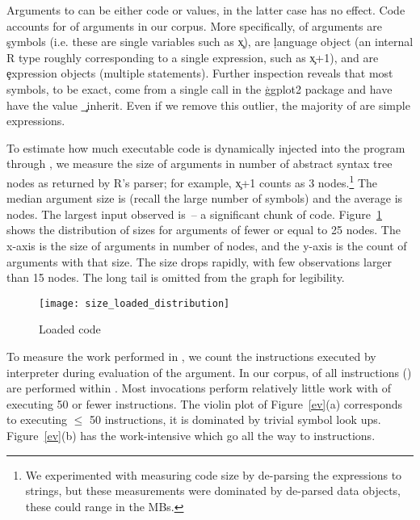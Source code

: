 \documentclass[USenglish,cleveref, autoref, thm-restate]{lipics-v2019}
\begin{document}
Arguments to \eval can be either code or values, in the latter case
\eval has no effect. Code accounts for \Codepercent of arguments in
our corpus. More specifically, \Symbolpercent of arguments are
\c{symbol}s (i.e. these are single variables such as \c{x}),
\Languagepercent are \c{language} object (an internal R type roughly
corresponding to a single expression, such as \c{x+1}), and
\Expressionpercent are \c{expression} objects (multiple statements).
Further inspection reveals that most symbols, \Ggplotsymbolpercent to
be exact, come from a single call in the \c{ggplot2} package and have
have the value \c{_inherit}. Even if we remove this outlier, the
majority of \evals are simple expressions.

To estimate how much executable code is dynamically injected into the
program through \eval, we measure the size of arguments in number of
abstract syntax tree nodes as returned by R's parser; for example,
\c{x+1} counts as 3 nodes.\footnote{We experimented with measuring
code size by de-parsing the expressions to strings, but these
measurements were dominated by de-parsed data objects, these could
range in the MBs.} The median argument size is \Medianszeval (recall
the large number of symbols) and the average is \Avgszeval nodes. The
largest \eval input observed is \Maxszeval\,-- a significant chunk of
code. Figure~\ref{fig:sizedistribution} shows the distribution of
sizes for arguments of fewer or equal to 25 nodes. The x-axis is the
size of arguments in number of nodes, and the y-axis is the count of
arguments with that size. The size drops rapidly, with few
observations larger than 15 nodes. The long tail is omitted from the
graph for legibility.

\begin{figure}[h!]
 \texttt{[image: size\_loaded\_distribution]}
\caption{Loaded code} \label{fig:sizedistribution}
\end{figure}

To measure the work performed in \evals, we count the instructions
executed by interpreter during evaluation of the argument. In our
corpus, \EvalEventAllPerc of all instructions (\EventsRnd) are
performed within \eval. Most invocations perform relatively little
work with \Smalleventspct of \evals executing 50 or fewer
instructions. The violin plot of Figure~\ref{ev}(a) corresponds to
\evals executing $\leq$ 50 instructions, it is dominated by trivial
symbol look ups. Figure~\ref{ev}(b) has the work-intensive \evals
which go all the way to \MaxeventsRnd instructions.
\end{document}
